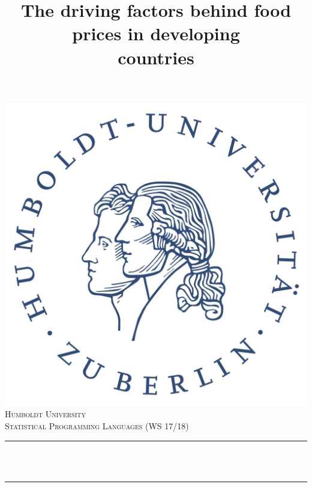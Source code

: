 \documentclass[11pt]{article}
\title{The driving factors behind food \\ prices in developing \\countries}
\makeatletter
\let\thetitle\@title
\makeatother
\begin{document}
\sloppy

\begin{titlepage}
    \centering
    \vspace*{0.5 cm}
    \includegraphics[scale = 0.15]{HU.jpg}\\[1.0 cm]   %
    \textsc{\LARGE Humboldt University}\\[2.0 cm]   %
    \textsc{\large Statistical Programming Languages (WS 17/18)}\\[0.5 cm]               %
    \rule{\linewidth}{0.2 mm} \\[0.4 cm]
    { \huge \bfseries \thetitle}\\
    \rule{\linewidth}{0.2 mm} \\[1.5 cm]
    
    \begin{minipage}{0.4\textwidth}
        \begin{flushleft} \large
              

\end{flushleft}
\end{minipage}
\end{titlepage}
\end{document}
